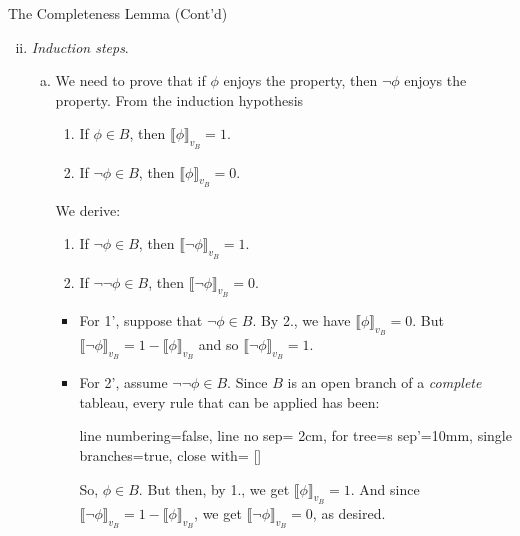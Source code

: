 \documentclass[../slides.tex]{subfiles}
\begin{document}
\begin{frame}{The Completeness Lemma (Cont'd)}

\begin{enumerate}[(i)]
	
	\setcounter{enumi}{1}
	
	\item \emph{Induction steps}.
	
	\begin{enumerate}[(a)]
		
			\item We need to prove that if $\phi$ enjoys the property, then $\neg \phi$ enjoys the property. From the induction hypothesis
		
				\begin{enumerate}[1.]
	
					\item If $\phi\in B$, then $\llbracket\phi\rrbracket_{v_B}=1$. 
	
					\item If $\neg \phi\in B$, then $\llbracket\phi\rrbracket_{v_B}=0$.
	
				\end{enumerate}
	We derive:
		\begin{enumerate}[1'.]
	
		\item If $\neg\phi\in B$, then $\llbracket\neg\phi\rrbracket_{v_B}=1$.
			\item If $\neg\neg \phi\in B$, then $\llbracket\neg\phi\rrbracket_{v_B}=0$.	
		\end{enumerate}
		
		\begin{itemize}
	
		\item For 1', suppose that $\neg \phi\in B$. By 2., we have $\llbracket\phi\rrbracket_{v_B}=0$. But $\llbracket\neg\phi\rrbracket_{v_B}=1-\llbracket\phi\rrbracket_{v_B}$ and so $\llbracket\neg\phi\rrbracket_{v_B}=1$.
		
		\item For 2', assume $\neg\neg \phi\in B$. Since $B$ is an open branch of a \emph{complete} tableau, every rule that can be applied has been:
		\begin{center}{\small
					\begin{prooftree}
					{
					line numbering=false,
					line no sep= 2cm,
					for tree={s sep'=10mm},
					single branches=true,
					close with=\xmark
					}
					[\neg\neg\phi [\phi ] ]
					\end{prooftree}}
			\end{center} 
		So, $\phi\in B$. But then, by 1., we get $\llbracket\phi\rrbracket_{v_B}=1$. And since $\llbracket\neg\phi\rrbracket_{v_B}=1-\llbracket\phi\rrbracket_{v_B}$, we get $\llbracket\neg\phi\rrbracket_{v_B}=0$, as desired.
		
	\end{itemize}
	
	\end{enumerate}
			
	\end{enumerate}

\end{frame}
\end{document}
